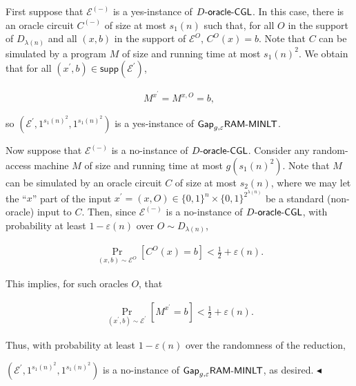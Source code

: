 First suppose that $\mathcal{E}^{(-)}$ is a yes-instance of $D\text{-}{\sf oracle}\text{-}{\sf CGL}$. In this case, there is an oracle circuit $C^{(-)}$ of size at most $s_{1}(n)$ such that, for all $O$ in the support of $D_{\lambda(n)}$ and all $(x,b)$ in the support of $\mathcal{E}^{O}$, $C^{O}(x)=b$. Note that $C$ can be simulated by a program $M$ of size and running time at most $s_{1}(n)^{2}$. We obtain that for all $(x^{\prime},b)\in{\mathsf{supp}}(\mathcal{E}^{\prime})$,\par


\[\begin{gathered}
M^{x^{\prime}}=M^{x,O}=b,
\end{gathered}\]


so $(\mathcal{E}^{\prime},1^{s_{1}(n)^{2}},1^{s_{1}(n)^{2}})$ is a yes-instance of ${\sf Gap}_{g,\varepsilon}{\sf RAM}\text{-}{\sf MINLT}$.\par




Now suppose that $\mathcal{E}^{(-)}$ is a no-instance of $D\text{-}{\sf oracle}\text{-}{\sf CGL}$. Consider any random-access machine $M$ of size and running time at most $g(s_{1}(n)^{2})$. Note that $M$ can be simulated by an oracle circuit $C$ of size at most $s_{2}(n)$, where we may let the “$x$” part of the input $x^{\prime}=(x,O)\in\{0,1\}^{n}\times\{0,1\}^{2^{\lambda(n)}}$ be a standard (non-oracle) input to $C$. Then, since $\mathcal{E}^{(-)}$ is a no-instance of $D\text{-}{\sf oracle}\text{-}{\sf CGL}$, with probability at least $1-\varepsilon(n)$ over $O\sim D_{\lambda(n)}$,\par


\[\begin{gathered}
\Pr_{(x,b)\sim\mathcal{E}^{O}}\left[C^{O}(x)=b\right]<\frac{1}{2}+\varepsilon(n).
\end{gathered}\]


This implies, for such oracles $O$, that\par


\[\begin{gathered}
\Pr_{(x^{\prime},b)\sim\mathcal{E}^{\prime}}\left[M^{x^{\prime}}=b\right]<\frac{1}{2}+\varepsilon(n).
\end{gathered}\]


Thus, with probability at least $1-\varepsilon(n)$ over the randomness of the reduction,


$(\mathcal{E}^{\prime},1^{s_{1}(n)^{2}},1^{s_{1}(n)^{2}})$ is a no-instance of ${\sf Gap}_{g,\varepsilon}{\sf RAM}\text{-}{\sf MINLT}$, as desired.
$\blacktriangleleft$\par






